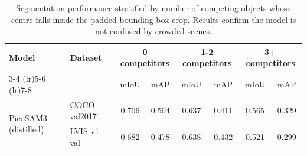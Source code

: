 \begin{table}[ht]
  \centering
  \small
  \caption{Segmentation performance stratified by number of competing objects whose centre falls inside the padded bounding-box crop. Results confirm the model is not confused by crowded scenes.}
  \label{tab:multiobj_robustness}
  \setlength{\tabcolsep}{5pt}
  \begin{tabular}{llcccccc}
    \toprule
    \textbf{Model} & \textbf{Dataset} & \multicolumn{2}{c}{\textbf{0 competitors}} & \multicolumn{2}{c}{\textbf{1-2 competitors}} & \multicolumn{2}{c}{\textbf{3+ competitors}} \\
    \cmidrule(lr){3-4} \cmidrule(lr){5-6} \cmidrule(lr){7-8}
    & & mIoU & mAP & mIoU & mAP & mIoU & mAP \\
    \midrule
    \multirow{2}{*}{PicoSAM3 (distilled)} & COCO val2017 & 0.706 & 0.504 & 0.637 & 0.411 & 0.565 & 0.329 \\
     & LVIS v1 val & 0.682 & 0.478 & 0.638 & 0.432 & 0.521 & 0.299 \\
    \bottomrule
  \end{tabular}
\end{table}
